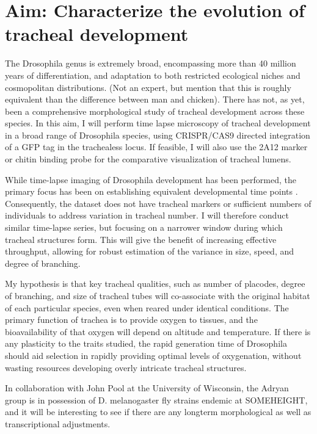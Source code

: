 \documentclass{proposal}
\begin{document}
\section{Aim: Characterize the evolution of tracheal development}

The Drosophila genus is extremely broad, encompassing more than 40 million years of differentiation, and adaptation to both restricted ecological niches and cosmopolitan distributions.
(Not an expert, but mention that this is roughly equivalent than the difference between man and chicken).
There has not, as yet, been a comprehensive morphological study of tracheal development across these species.
In this aim, I will perform time lapse microscopy of tracheal development in a broad range of Drosophila species, using CRISPR/CAS9 directed integration of a GFP tag in the trachealess locus.
If feasible, I will also use the 2A12 marker or chitin binding probe for the comparative visualization of tracheal lumens.  

While time-lapse imaging of Drosophila development has been performed, the primary focus has been on establishing equivalent developmental time points \cite{Kuntz:2014bc}.
Consequently, the dataset does not have tracheal markers or sufficient numbers of individuals to address variation in tracheal number.
I will therefore conduct similar time-lapse series, but focusing on a narrower window during which tracheal structures form.
This will give the benefit of increasing effective throughput, allowing for robust estimation of the variance in size, speed, and degree of branching. 

My hypothesis is that key tracheal qualities, such as number of placodes, degree of branching, and size of tracheal tubes will co-associate with the original habitat of each particular species, even when reared under identical conditions.
The primary function of trachea is to provide oxygen to tissues, and the bioavailability of that oxygen will depend on altitude and temperature.
If there is any plasticity to the traits studied, the rapid generation time of Drosophila should aid selection in rapidly providing optimal levels of oxygenation, without wasting resources developing overly intricate tracheal structures. 


In collaboration with John Pool at the University of Wisconsin, the Adryan group is in possession of D. melanogaster fly strains endemic at SOMEHEIGHT, and it will be interesting to see if there are any longterm morphological as well as transcriptional adjustments.
\end{document}
